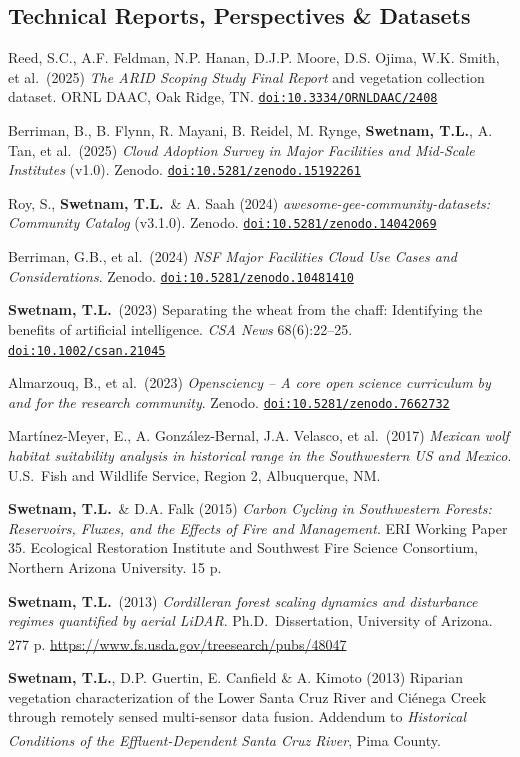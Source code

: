 \documentclass[11pt,letterpaper]{article}
\newcommand{\me}{\textbf{Swetnam, T.L.}}
\newcommand{\doi}[1]{\href{https://doi.org/#1}{\nolinkurl{doi:#1}}}
\newcommand{\grad}{\textsuperscript{\color{muted}\,\dag}}
\newenvironment{hanglist}
  {\begin{list}{}{\setlength{\leftmargin}{1.4em}\setlength{\itemindent}{-1.4em}%
     \setlength{\itemsep}{3pt}\setlength{\parsep}{0pt}\setlength{\topsep}{1pt}}}
  {\end{list}}
\begin{document}
\subsection{Technical Reports, Perspectives \& Datasets}
\begin{hanglist}
\item Reed, S.C., A.F. Feldman, N.P. Hanan, D.J.P. Moore, D.S. Ojima, W.K. Smith, et al.\ (2025) \textit{The ARID Scoping Study Final Report} and vegetation collection dataset. ORNL DAAC, Oak Ridge, TN. \doi{10.3334/ORNLDAAC/2408}
\item Berriman, B., B. Flynn, R. Mayani, B. Reidel, M. Rynge, \me, A. Tan, et al.\ (2025) \textit{Cloud Adoption Survey in Major Facilities and Mid-Scale Institutes} (v1.0). Zenodo. \doi{10.5281/zenodo.15192261}
\item Roy, S., \me\ \& A. Saah (2024) \textit{awesome-gee-community-datasets: Community Catalog} (v3.1.0). Zenodo. \doi{10.5281/zenodo.14042069}
\item Berriman, G.B., et al.\ (2024) \textit{NSF Major Facilities Cloud Use Cases and Considerations}. Zenodo. \doi{10.5281/zenodo.10481410}
\item \me\ (2023) Separating the wheat from the chaff: Identifying the benefits of artificial intelligence. \textit{CSA News} 68(6):22--25. \doi{10.1002/csan.21045}
\item Almarzouq, B., et al.\ (2023) \textit{Opensciency -- A core open science curriculum by and for the research community}. Zenodo. \doi{10.5281/zenodo.7662732}
\item Mart\'inez-Meyer, E., A. Gonz\'alez-Bernal, J.A. Velasco, et al.\ (2017) \textit{Mexican wolf habitat suitability analysis in historical range in the Southwestern US and Mexico}. U.S.\ Fish and Wildlife Service, Region 2, Albuquerque, NM.
\item \me\ \& D.A. Falk (2015) \textit{Carbon Cycling in Southwestern Forests: Reservoirs, Fluxes, and the Effects of Fire and Management}. ERI Working Paper 35. Ecological Restoration Institute and Southwest Fire Science Consortium, Northern Arizona University. 15 p.
\item \me\ (2013) \textit{Cordilleran forest scaling dynamics and disturbance regimes quantified by aerial LiDAR}. Ph.D.\ Dissertation, University of Arizona. 277 p. \url{https://www.fs.usda.gov/treesearch/pubs/48047}\grad
\item \me, D.P. Guertin, E. Canfield \& A. Kimoto (2013) Riparian vegetation characterization of the Lower Santa Cruz River and Ci\'enega Creek through remotely sensed multi-sensor data fusion. Addendum to \textit{Historical Conditions of the Effluent-Dependent Santa Cruz River}, Pima County.\grad

\end{hanglist}
\end{document}
